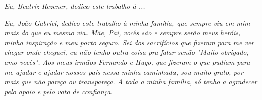 \begin{dedicatoria}
   \vspace*{\fill}
   \centering
   \noindent
    \textit{
    	Eu, Beatriz Rezener, dedico este trabalho à ...}
    
   \textit{
   	Eu, João Gabriel, dedico este trabalho à minha família, que sempre viu em mim mais do  que eu mesmo via.  Mãe, Pai, vocês são e sempre serão meus heróis, minha inspiração e meu porto seguro. Sei dos sacrifícios que fizeram para me 
   ver chegar onde cheguei, eu não tenho outra coisa pra falar senão "Muito obrigado, amo vocês". Aos meus irmãos Fernando e Hugo, que fizeram o que pudiam para me ajudar e ajudar nossos pais nessa minha caminhada, sou muito grato, por mais que não pareça ou transpareça. A toda a minha família, só tenho a agradecer pelo apoio e pelo voto de confiança.} \vspace*{\fill}
\end{dedicatoria}
